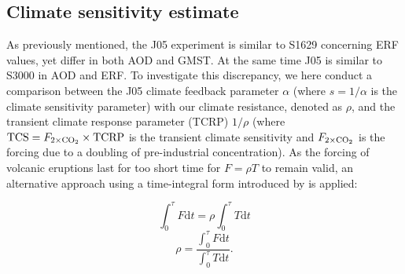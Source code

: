 \documentclass[draft]{agujournal2019}
\begin{document}

  \subsection{Climate sensitivity estimate}

  As previously mentioned, the J05 experiment is similar to S1629 concerning ERF values,
  yet differ in both AOD and GMST. At the same time J05 is similar to S3000 in AOD and
  ERF. To investigate this discrepancy, we here conduct a comparison between the J05
  climate feedback parameter \(\alpha\) (where \(s=1/\alpha\) is the climate sensitivity
  parameter) with our climate resistance, denoted as \(\rho\), and the transient climate
  response parameter (TCRP) \(1/\rho\) (where \(\mathrm{TCS}=F_{2\times\ce{CO2}}\times
  \mathrm{TCRP}\) is the transient climate sensitivity and \(F_{2\times\ce{CO2}}\) is
  the forcing due to a doubling of pre-industrial  concentration). As the
  forcing of volcanic eruptions last for too short time for \(F=\rho T\) to remain
  valid, an alternative approach using a time-integral form introduced by
   is applied:

  \begin{equation}
    \int_0^{\tau}F \mathrm{d}t=\rho\int_{0}^{\tau}T \mathrm{d}t
    \label{eq:climate-resistance-orig}
  \end{equation}
  \begin{equation}
    \rho=\frac{\int_0^{\tau}F \mathrm{d}t}{\int_{0}^{\tau}T \mathrm{d}t}.
    \label{eq:climate-resistance}
  \end{equation}
\end{document}
